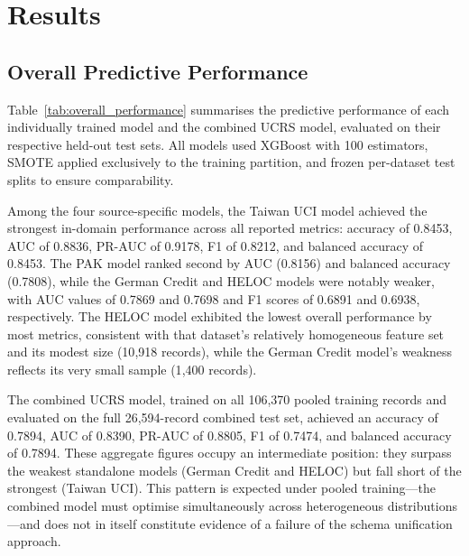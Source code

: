 \documentclass[onecolumn]{IEEEtai}
\begin{document}
\section{Results}\vspace{-6pt}

\subsection{Overall Predictive Performance}\vspace{-2pt}

Table~\ref{tab:overall_performance} summarises the predictive performance of each individually trained model and the combined UCRS model, evaluated on their respective held-out test sets. All models used XGBoost with 100 estimators, SMOTE applied exclusively to the training partition, and frozen per-dataset test splits to ensure comparability.

Among the four source-specific models, the Taiwan UCI model achieved the strongest in-domain performance across all reported metrics: accuracy of 0.8453, AUC of 0.8836, PR-AUC of 0.9178, F1 of 0.8212, and balanced accuracy of 0.8453. The PAK model ranked second by AUC (0.8156) and balanced accuracy (0.7808), while the German Credit and HELOC models were notably weaker, with AUC values of 0.7869 and 0.7698 and F1 scores of 0.6891 and 0.6938, respectively. The HELOC model exhibited the lowest overall performance by most metrics, consistent with that dataset's relatively homogeneous feature set and its modest size (10{,}918 records), while the German Credit model's weakness reflects its very small sample (1{,}400 records).

The combined UCRS model, trained on all 106{,}370 pooled training records and evaluated on the full 26{,}594-record combined test set, achieved an accuracy of 0.7894, AUC of 0.8390, PR-AUC of 0.8805, F1 of 0.7474, and balanced accuracy of 0.7894. These aggregate figures occupy an intermediate position: they surpass the weakest standalone models (German Credit and HELOC) but fall short of the strongest (Taiwan UCI). This pattern is expected under pooled training---the combined model must optimise simultaneously across heterogeneous distributions---and does not in itself constitute evidence of a failure of the schema unification approach.
\end{document}
